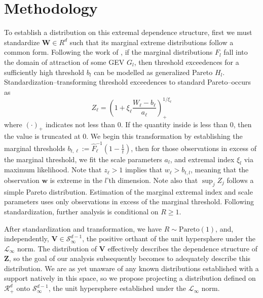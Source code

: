 \section{Methodology}
To establish a distribution on this extremal dependence structure, first we must standardize
  $\bm{W} \in R^d$ such that its marginal extreme distributions follow a common form.  Following
  the work of \cite{ferreira2014}, if the marginal distributions $F_{l}$ fall into the domain
  of attraction of some GEV $G_l$, then threshold exceedences for a sufficiently high threshold
  $b_{l}$ can be modelled as generalized Pareto $H_l$.  Standardization--transforming threshold
  exceedences to standard Pareto--occurs as
  \begin{equation}
    \label{eqn:standardization}
    Z_{\ell} = \left(1 + \xi_{\ell}\frac{W_{\ell} - b_{\ell}}{a_{\ell}}\right)_{+}^{1/\xi_{\ell}}
  \end{equation}
  where $(\cdot)_{+}$ indicates not less than 0. If the quantity inside is less than 0, then the value
  is truncated at 0.  We begin this transformation by establishing the marginal thresholds
  $b_{t,\ell} := \hat{F}_{\ell}^{-1}\left(1 - \frac{1}{t}\right)$, then for those observations
  in excess of the marginal threshold, we fit the scale parameters $a_{l}$, and extremal index $\xi_l$
  via maximum likelihood. Note that $z_{\ell} > 1$ implies that $w_{\ell} > b_{t,l}$, meaning that the observation
  $\bm{w}$ is extreme in the $l$'th dimension.  Note also that $\sup_j Z_j$ follows a simple Pareto
  distribution. Estimation of the marginal extremal index and scale parameters uses only observations
  in excess of the marginal threshold. Following standardization, further analysis is conditional on
  $R \geq 1$.

After standardization and transformation, we have $R\sim\text{Pareto}(1)$, and, independently,
  $\bm{V}\in\mathcal{S}_{\infty}^{d-1}$, the positive orthant of the unit hypersphere under the
  $\mathcal{L}_{\infty}$ norm.  The distribution of $\bm{V}$ effectively describes the dependence
  structure of $\bm{Z}$, so the goal of our analysis subsequently becomes to adequately describe this
  distribution.  We are as yet unaware of any known distributions established with a support
  natively in this space, so we propose projecting a distribution defined on $\mathcal{R}_{+}^{d}$ onto
  $\mathcal{S}_{\infty}^{d-1}$, the unit hypersphere established under the $\mathcal{L}_{\infty}$ norm.

  

  

  
